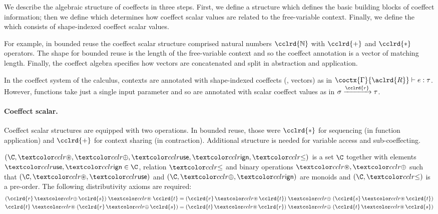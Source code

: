 We describe the algebraic structure of coeffects in three
steps. First, we define a \emph{} structure 
which defines the basic building blocks of coeffect information;
then we define \emph{} which determines how
coeffect scalar values are related to the free-variable context. 
Finally, we define the \emph{} which consists of shape-indexed coeffect scalar values.

For example, in bounded reuse the coeffect scalar structure
comprised natural numbers $\cclrd{\mathbb{N}}$ with $\cclrd{+}$ and
$\cclrd{\ast}$ operators. The shape for bounded reuse is the length of the
free-variable context and so the coeffect annotation is a vector of matching length.
Finally, the coeffect algebra specifies how vectors are
concatenated and split in abstraction and application. 

In the coeffect system of the calculus, contexts are annotated with shape-indexed coeffects (\eg{}, vectors)  as in
$\coctx{\Gamma}{\aclrd{R}} \vdash e : \tau$. However, functions take just a single 
input parameter and so are annotated with scalar coeffect values as in $\sigma \xrightarrow{\cclrd{r}} \tau$.

\paragraph{Coeffect scalar.}
Coeffect scalar structures are equipped with two operations. In bounded reuse, those 
were $\cclrd{\ast}$ for sequencing (in function application) and $\cclrd{+}$ for context 
sharing (in contraction). Additional structure is needed for variable access and sub-coeffecting.

\begin{definition}
\emph{} $(\C, \cseq, \cpar, \cunit, \czero, \cleq)$ is a set $\C$
together with elements $\cunit,\czero \in \C$, relation $\cleq$ and binary operations 
$\cseq, \cpar$ such that $(\C, \cseq, \cunit)$ and $(\C, \cpar, \czero)$ are monoids
and $(\C, \cleq)$ is a pre-order. The following distributivity axioms are required:
\begin{align*}
(\cclrd{r}\, \cpar\, \cclrd{s}) \;\cseq\; \cclrd{t} & = (\cclrd{r} \,\cseq\, \cclrd{t}) \;\cpar\; (\cclrd{s}\, \cseq\, \cclrd{t}) \\
\cclrd{t} \;\cseq\; (\cclrd{r}\, \cpar\, \cclrd{s}) & = (\cclrd{t} \,\cseq\, \cclrd{r}) \;\cpar\; (\cclrd{t}\, \cseq\, \cclrd{s})
\end{align*}
\end{definition}

